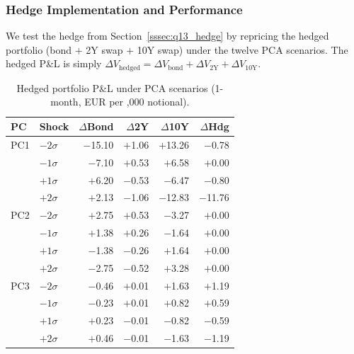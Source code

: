 \documentclass[11pt,a4paper]{article}
\begin{document}
\subsubsection{Hedge Implementation and Performance}
\label{sssec:q14_hedge_impl}

We test the hedge from Section~\ref{sssec:q13_hedge} by repricing the
hedged portfolio (bond $+$  2Y swap $+$  10Y swap)
under the twelve PCA scenarios.  The hedged P\&L is simply
$\Delta V_{\text{hedged}} = \Delta V_{\text{bond}}
+ \Delta V_{\text{2Y}} + \Delta V_{\text{10Y}}$.

\begin{table}
  \centering\scriptsize
  \vspace{-12pt}
  \setlength{\tabcolsep}{2pt}
  \begin{tabular}{@{}llrrrr@{}}
    \toprule
    \textbf{PC} & \textbf{Shock}
      & \textbf{$\Delta$Bond} & \textbf{$\Delta$2Y}
      & \textbf{$\Delta$10Y} & \textbf{$\Delta$Hdg} \\
    \midrule
    PC1 & $-2\sigma$ & $-$15.10 & $+$1.06 & $+$13.26 & $-$0.78 \\
        & $-1\sigma$ & $-$7.10  & $+$0.53 & $+$6.58  & $+$0.00 \\
        & $+1\sigma$ & $+$6.20  & $-$0.53 & $-$6.47  & $-$0.80 \\
        & $+2\sigma$ & $+$2.13  & $-$1.06 & $-$12.83 & $-$11.76 \\
    \midrule
    PC2 & $-2\sigma$ & $+$2.75  & $+$0.53 & $-$3.27  & $+$0.00 \\
        & $-1\sigma$ & $+$1.38  & $+$0.26 & $-$1.64  & $+$0.00 \\
        & $+1\sigma$ & $-$1.38  & $-$0.26 & $+$1.64  & $+$0.00 \\
        & $+2\sigma$ & $-$2.75  & $-$0.52 & $+$3.28  & $+$0.00 \\
    \midrule
    PC3 & $-2\sigma$ & $-$0.46  & $+$0.01 & $+$1.63  & $+$1.19 \\
        & $-1\sigma$ & $-$0.23  & $+$0.01 & $+$0.82  & $+$0.59 \\
        & $+1\sigma$ & $+$0.23  & $-$0.01 & $-$0.82  & $-$0.59 \\
        & $+2\sigma$ & $+$0.46  & $-$0.01 & $-$1.63  & $-$1.19 \\
    \bottomrule
  \end{tabular}
  \vspace{2pt}
  \caption{Hedged portfolio P\&L under PCA scenarios
    (1-month, EUR per ,000 notional).}
  \label{tab:q14_hedge_perf}
  \vspace{-10pt}
\end{table}
\end{document}

